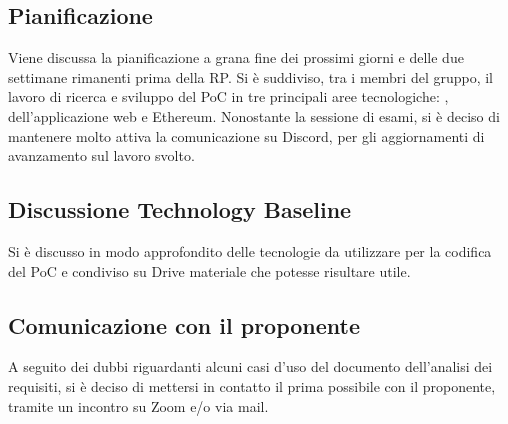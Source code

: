 \subsection*{Pianificazione}
Viene discussa la pianificazione a grana fine dei prossimi giorni e delle due settimane rimanenti prima della RP. Si è suddiviso, tra i membri del gruppo, il lavoro di ricerca e sviluppo del PoC in tre principali aree tecnologiche: ,  dell'applicazione web e Ethereum. 
Nonostante la sessione di esami, si è deciso di mantenere molto attiva la comunicazione su Discord, per gli aggiornamenti di avanzamento sul lavoro svolto.

\subsection*{Discussione Technology Baseline}
Si è discusso in modo approfondito delle tecnologie da utilizzare per la codifica del PoC e condiviso su Drive materiale che potesse risultare utile.

\subsection*{Comunicazione con il proponente}
A seguito dei dubbi riguardanti alcuni casi d'uso del documento dell'analisi dei requisiti, si è deciso di mettersi in contatto il prima possibile con il proponente, tramite un incontro su Zoom e/o via mail.